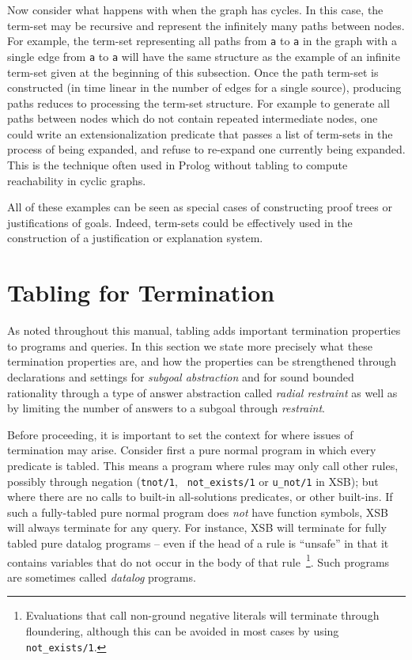 Now consider what happens with when the graph has cycles.  In this
case, the term-set may be recursive and represent the infinitely many
paths between nodes.  For example, the term-set representing all paths
from {\tt a} to {\tt a} in the graph with a single edge from {\tt a} to
{\tt a} will have the same structure as the example of an infinite
term-set given at the beginning of this subsection.  Once the path
term-set is constructed (in time linear in the number of edges for a
single source), producing paths reduces to processing the term-set
structure.  For example to generate all paths between nodes which do
not contain repeated intermediate nodes, one could write an
extensionalization predicate that passes a list of term-sets in the
process of being expanded, and refuse to re-expand one currently being
expanded.  This is the technique often used in Prolog without tabling
to compute reachability in cyclic graphs.

All of these examples can be seen as special cases of constructing
proof trees or justifications of goals.  Indeed, term-sets could be
effectively used in the construction of a justification or explanation
system.

\section{Tabling for Termination} \label{sec:tabling-termination}
%
As noted throughout this manual, tabling adds important termination
properties to programs and queries.  In this section we state more
precisely what these termination properties are, and how the
properties can be strengthened through declarations and settings for
{\em subgoal abstraction} and for sound bounded rationality through a
type of answer abstraction called {\em radial restraint} as well as by
limiting the number of answers to a subgoal through {\em \maxans{}
  restraint}.

Before proceeding, it is important to set the context for where issues
of termination may arise.  Consider first a pure normal program in
which every predicate is tabled.  This means a program where rules may
only call other rules, possibly through negation ({\tt tnot/1}, {\tt
  not\_exists/1} or {\tt u\_not/1} in XSB); but where there are no
calls to built-in all-solutions predicates, or other built-ins.  If
such a fully-tabled pure normal program does {\em not} have function
symbols, XSB will always terminate for any query.  For instance, XSB
will terminate for fully tabled pure datalog programs -- even if the
head of a rule is ``unsafe'' in that it contains variables that do not
occur in the body of that rule~\footnote{Evaluations that call
  non-ground negative literals will terminate through floundering,
  although this can be avoided in most cases by using {\tt
    not\_exists/1}.}.  Such programs are sometimes called \emph{datalog}
programs.

